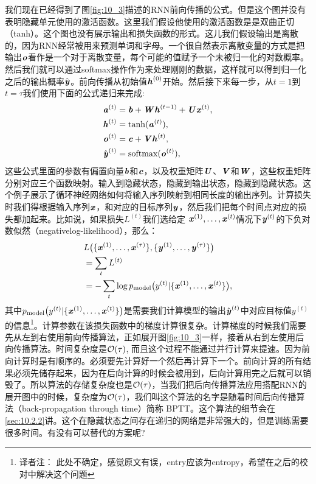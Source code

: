 我们现在已经得到了图\ref{fig:10_3}描述的RNN前向传播的公式。但是这个图并没有表明隐藏单元使用的激活函数。这里我们假设他使用的激活函数是是双曲正切（tanh）。这个图也没有展示输出和损失函数的形式。这儿我们假设输出是离散的，因为RNN经常被用来预测单词和字母。一个很自然表示离散变量的方式是把输出$\boldsymbol{\mathit{o}}$看作是一个对于离散变量，每个可能的值赋予一个未被归一化的对数概率。然后我们就可以通过softmax操作作为来处理刚刚的数据，这样就可以得到归一化之后的输出概率$\hat {\boldsymbol{\mathit{y}}}$。前向传播从初始值$\boldsymbol{\mathit{h}}^{(0)}$开始。然后接下来每一步，从$t= 1$到$t = \tau$我们使用下面的公式递归来完成:
\begin{align}
\label{eq:108a}
 \boldsymbol{\mathit{a}}^{(t)} &= \boldsymbol{\mathit{b}} + \boldsymbol{\mathit{W}} \boldsymbol{\mathit{h}}^{(t-1)} + \boldsymbol{\mathit{U}} \boldsymbol{\mathit{x}}^{(t)}, \\
  \boldsymbol{\mathit{h}}^{(t)} &= \tanh(\boldsymbol{\mathit{a}}^{(t)} ), \\
  \boldsymbol{\mathit{o}}^{(t)} &= \boldsymbol{\mathit{c}} + \boldsymbol{\mathit{V}} \boldsymbol{\mathit{h}}^{(t)}, \\
  \hat {\boldsymbol{\mathit{y}}}^{(t)} &= \text{softmax}(\boldsymbol{\mathit{o}}^{(t)}),
\end{align}
这些公式里面的参数有偏置向量$\boldsymbol{\mathit{b}}$和$\boldsymbol{\mathit{c}}$，以及权重矩阵$\boldsymbol{\mathit{U}}$、$\boldsymbol{\mathit{V}}$和$\boldsymbol{\mathit{W}}$，这些权重矩阵分别对应三个函数映射。输入到隐藏状态，隐藏到输出状态，隐藏到隐藏状态。这个例子展示了循环神经网络如何将输入序列映射到相同长度的输出序列。计算损失时我们得根据输入序列$\boldsymbol{\mathit{x}}$，和对应的目标序列$\boldsymbol{\mathit{y}}$，然后我们把每个时间点对应的损失都加起来。比如说，如果损失$L^{(t)}$我们选给定 $\boldsymbol{\mathit{x}}^{(1)}, \dots, \boldsymbol{\mathit{x}}^{(t)}$情况下$\boldsymbol{\mathit{y}}^{(t)}$的下负对数似然（negativelog-likelihood），那么：
\begin{align} \label{eq:1012L}
 & L\big( \{ \boldsymbol{\mathit{x}}^{(1)}, \dots, \boldsymbol{\mathit{x}}^{(\tau)} \}, \{ \boldsymbol{\mathit{y}}^{(1)}, \dots, \boldsymbol{\mathit{y}}^{(\tau)}  \} \big) \\
 & = \sum_t L^{(t)} \\
 & = - \sum_t \log p_{\text{model}} \big(  y^{(t)} |  \{ \boldsymbol{\mathit{x}}^{(1)}, \dots, \boldsymbol{\mathit{x}}^{(t)} \} \big) ,
\end{align}
其中$p_{\text{model}} \big(  y^{(t)} |  \{ \boldsymbol{\mathit{x}}^{(1)}, \dots, \boldsymbol{\mathit{x}}^{(t)} \} \big) $是需要我们计算模型的输出$\hat {\boldsymbol{\mathit{y}}}^{(t)}$中对应目标值$y^{(t)}$的信息\footnote{译者注： 此处不确定，感觉原文有误，entry应该为entropy，希望在之后的校对中解决这个问题}。计算参数在该损失函数中的梯度计算很复杂。计算梯度的时候我们需要先从左到右使用前向传播算法，正如展开图\ref{fig:10_3}一样，接着从右到左使用后向传播算法。时间复杂度是$\mathcal{O}(\tau)$, 而且这个过程不能通过并行计算来提速。因为前向计算时是有顺序的。必须要先计算好一个然后再计算下一个。前向计算的所有结果必须先储存起来，因为在后向计算的时候会被用到，后向计算用完之后就可以销毁了。所以算法的存储复杂度也是$\mathcal{O}(\tau)$，当我们把后向传播算法应用搭配RNN的展开图中的时候，复杂度为$\mathcal{O}(\tau)$，我们叫这个算法的名字是随着时间后向传播算法（back-propagation through time）简称 BPTT。这个算法的细节会在\ref{sec:10.2.2}讲。这个在隐藏状态之间存在递归的网络是非常强大的，但是训练需要很多时间。有没有可以替代的方案呢?

